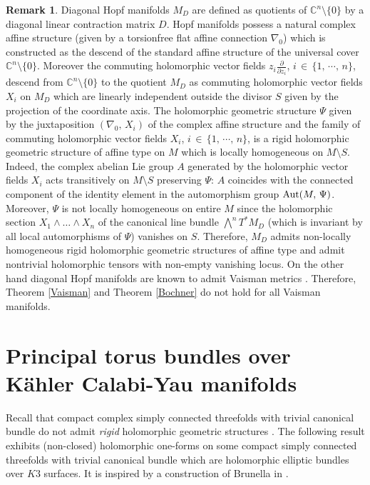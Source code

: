 \documentclass[12pt,reqno]{amsart}
\theoremstyle{definition}
\newtheorem{remark}[theorem]{Remark}
\numberwithin{equation}{section}
\begin{document}
\begin{remark}\label{diagonal Hopf}
Diagonal Hopf manifolds $M_D$ are defined as quotients of ${\mathbb C}^n \setminus \{0 \}$ by a diagonal 
linear contraction matrix $D$. Hopf manifolds possess a natural complex affine structure 
(given by a torsionfree flat affine connection $\nabla_0$) which is constructed
as the descend of the standard affine 
structure of the universal cover ${\mathbb C}^n \setminus \{0 \}$. Moreover the commuting holomorphic 
vector fields $\displaystyle z_i \frac{\partial}{\partial z_i}$, $i \,\in\, \{1,\, \cdots ,\, n\}$, descend 
from ${\mathbb C}^n \setminus \{0 \}$ to the quotient $M_D$ as commuting holomorphic vector fields $X_i$ on 
$M_D$ which are linearly independent outside the divisor $S$ given by the projection of the coordinate 
axis. The holomorphic geometric structure $\Psi$ given by the juxtaposition $(\nabla_0,\, X_i)$ of the 
complex affine structure and the family of commuting holomorphic vector fields $X_i$, $i \,\in\, \{1,\, 
\cdots ,\, n\}$, is a rigid holomorphic geometric structure of affine type on $M$ \cite{DG, Gr} which is 
locally homogeneous on $M\setminus S$. Indeed, the complex abelian Lie group $A$ generated by the 
holomorphic vector fields $X_i$ acts transitively on $M \setminus S$ preserving $\Psi$: $A$ coincides with 
the connected component of the identity element in the automorphism group ${\rm Aut}(M,\, \Psi)$. Moreover, $\Psi$ is 
not locally homogeneous on entire $M$ since the holomorphic section $X_1 \wedge \ldots \wedge X_n$ of the 
canonical line bundle $\bigwedge^n {T^*}M_D$ (which is invariant by all local automorphisms of $\Psi$) 
vanishes on $S$. Therefore, $M_D$ admits non-locally homogeneous rigid holomorphic geometric structures of 
affine type and admit nontrivial holomorphic tensors with non-empty vanishing locus. On the other hand diagonal Hopf manifolds are known to admit Vaisman metrics 
\cite{Bel}. Therefore, Theorem \ref{Vaisman} and Theorem \ref{Bochner} do not hold for all Vaisman 
manifolds.
\end{remark} 

\section{Principal torus bundles over K\"ahler Calabi-Yau manifolds}\label{forms}

Recall that compact complex simply connected threefolds with trivial canonical bundle do not admit {\it 
rigid} holomorphic geometric structures \cite[Theorem D]{BCDG}. The following result exhibits (non-closed) 
holomorphic one-forms on some compact simply connected threefolds with trivial canonical bundle which are 
holomorphic elliptic bundles over $K3$ surfaces. It is inspired by a construction of Brunella in \cite[page 
648]{Br}.
\end{document}

